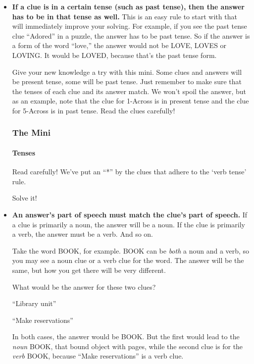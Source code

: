 \begin{itemize}
\item
  \textbf{If a clue is in a certain tense (such as past tense), then the
  answer has to be in that tense as well.} This is an easy rule to start
  with that will immediately improve your solving. For example, if you
  see the past tense clue ``Adored'' in a puzzle, the answer has to be
  past tense. So if the answer is a form of the word ``love,'' the
  answer would not be LOVE, LOVES or LOVING. It would be LOVED, because
  that's the past tense form.

  Give your new knowledge a try with this mini. Some clues and answers
  will be present tense, some will be past tense. Just remember to make
  sure that the tenses of each clue and its answer match. We won't spoil
  the answer, but as an example, note that the clue for 1-Across is in
  present tense and the clue for 5-Across is in past tense. Read the
  clues carefully!~

  \hypertarget{the-mini-2}{%
  \subsubsection{The Mini}\label{the-mini-2}}

  \href{https://www.nytimes.com/crosswords/game/special/tenses}{}

  \hypertarget{tenses}{%
  \paragraph{Tenses}\label{tenses}}

  Read carefully! We've put an ``*'' by the clues that adhere to the
  `verb tense' rule.

  Solve it!
\item
  \textbf{An answer's part of speech must match the clue's part of
  speech.} If a clue is primarily a noun, the answer will be a noun. If
  the clue is primarily a verb, the answer must be a verb. And so on.

  Take the word BOOK, for example. BOOK can be \emph{both} a noun and a
  verb, so you may see a noun clue or a verb clue for the word. The
  answer will be the same, but how you get there will be very different.

  What would be the answer for these two clues?

  ``Library unit''

  ``Make reservations''

  In both cases, the answer would be BOOK. But the first would lead to
  the \emph{noun} BOOK, that bound object with pages, while the second
  clue is for the \emph{verb} BOOK, because ``Make reservations'' is a
  verb clue.


\end{itemize}
